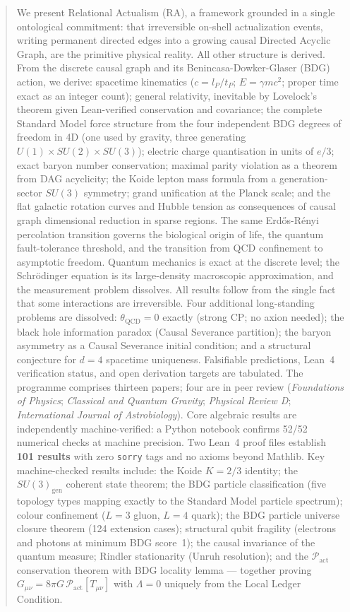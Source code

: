 \documentclass[11pt,a4paper]{article}
\begin{document}
\begin{titlepage}
\begin{abstract}
We present Relational Actualism (RA), a framework grounded in a single
ontological commitment: that irreversible on-shell actualization events,
writing permanent directed edges into a growing causal Directed Acyclic Graph,
are the primitive physical reality. All other structure is derived.
From the discrete causal graph and its Benincasa-Dowker-Glaser (BDG) action,
we derive: spacetime kinematics ($c = l_P/t_P$; $E = \gamma mc^2$; proper time
exact as an integer count); general relativity, inevitable by Lovelock's theorem
given Lean-verified conservation and covariance; the complete Standard Model
force structure from the four independent BDG degrees of freedom in 4D (one
used by gravity, three generating $U(1)\times SU(2)\times SU(3)$); electric
charge quantisation in units of $e/3$; exact baryon number conservation;
maximal parity violation as a theorem from DAG acyclicity; the Koide lepton
mass formula from a generation-sector $SU(3)$ symmetry; grand unification at
the Planck scale; and the flat galactic rotation curves and Hubble tension
as consequences of causal graph dimensional reduction in sparse regions.
The same Erd\H{o}s-R\'{e}nyi percolation transition governs the biological
origin of life, the quantum fault-tolerance threshold, and the transition from
QCD confinement to asymptotic freedom.
Quantum mechanics is exact at the discrete level; the Schr\"{o}dinger equation
is its large-density macroscopic approximation, and the measurement problem
dissolves. All results follow from the single fact that some interactions are
irreversible. Four additional long-standing problems are dissolved: $\theta_{\mathrm{QCD}} = 0$ exactly (strong CP; no axion needed); the black hole information paradox (Causal Severance partition); the baryon asymmetry as a Causal Severance initial condition; and a structural conjecture for $d = 4$ spacetime uniqueness. Falsifiable predictions, Lean~4 verification status, and open
derivation targets are tabulated. The programme comprises thirteen papers;
four are in peer review (\emph{Foundations of Physics}; \emph{Classical
and Quantum Gravity}; \emph{Physical Review D}; \emph{International Journal
of Astrobiology}).
Core algebraic results are independently machine-verified: a Python
notebook confirms 52/52 numerical checks at machine precision.
Two Lean~4 proof files establish \textbf{101 results} with zero
\texttt{sorry} tags and no axioms beyond Mathlib.
Key machine-checked results include: the Koide $K = 2/3$ identity;
the $SU(3)_{\mathrm{gen}}$ coherent state theorem; the BDG particle
classification (five topology types mapping exactly to the Standard Model
particle spectrum); colour confinement ($L{=}3$ gluon, $L{=}4$ quark);
the BDG particle universe closure theorem (124 extension cases); structural
qubit fragility (electrons and photons at minimum BDG score~1); the
causal invariance of the quantum measure; Rindler stationarity (Unruh
resolution); and the $\mathcal{P}_{\mathrm{act}}$ conservation theorem
with BDG locality lemma --- together proving $G_{\mu\nu} = 8\pi G\,
\mathcal{P}_{\mathrm{act}}[T_{\mu\nu}]$ with $\Lambda = 0$ uniquely
from the Local Ledger Condition.
\end{abstract}


\end{titlepage}
\end{document}
